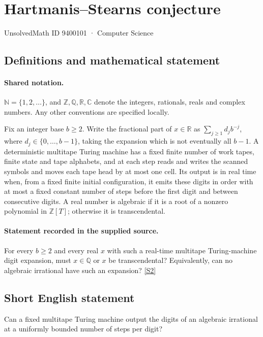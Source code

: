 \documentclass[11pt]{article}
\newcommand{\sref}[2]{\hyperlink{source:#1:#2}{[S#2]}}
\begin{document}
\setcounter{section}{9400100}
\section{Hartmanis–Stearns conjecture}\label{9400101}
{\small\sffamily UnsolvedMath ID 9400101 · Computer Science}
\subsection{Definitions and mathematical statement}

\paragraph{Shared notation.}$\mathbb N=\{1,2,\ldots\}$, and $\mathbb Z,\mathbb Q,\mathbb R,\mathbb C$ denote the integers, rationals, reals and complex numbers. Any other conventions are specified locally.


Fix an integer base $b\ge2$. Write the fractional part of $x\in\mathbb R$ as $\sum_{j\ge1}d_jb^{-j}$, where $d_j\in\{0,\ldots,b-1\}$, taking the expansion which is not eventually all $b-1$. A deterministic multitape Turing machine has a fixed finite number of work tapes, finite state and tape alphabets, and at each step reads and writes the scanned symbols and moves each tape head by at most one cell. Its output is in real time when, from a fixed finite initial configuration, it emits these digits in order with at most a fixed constant number of steps before the first digit and between consecutive digits. A real number is algebraic if it is a root of a nonzero polynomial in $\mathbb Z[T]$; otherwise it is transcendental.
\paragraph{Statement recorded in the supplied source.}
For every $b\ge2$ and every real $x$ with such a real-time multitape Turing-machine digit expansion, must $x\in\mathbb Q$ or $x$ be transcendental? Equivalently, can no algebraic irrational have such an expansion? \sref{9400101}{2}
\subsection{Short English statement}
Can a fixed multitape Turing machine output the digits of an algebraic irrational at a uniformly bounded number of steps per digit?
\end{document}
